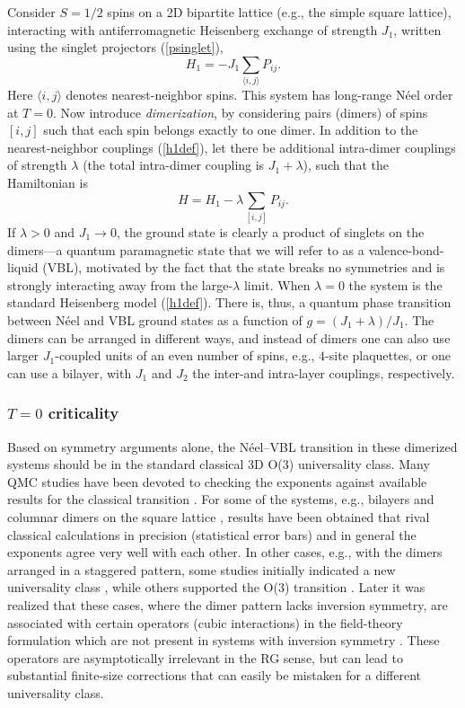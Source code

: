 \documentclass[range]{ar2e}
\begin{document}
Consider $S=1/2$ spins on a 2D bipartite lattice (e.g., the simple square lattice), interacting with antiferromagnetic Heisenberg exchange of 
strength $J_1$, written using the singlet projectors (\ref{psinglet}),
\begin{equation}
H_1 = -J_1 \sum_{\langle i,j\rangle} P_{ij}.
\label{h1def}
\end{equation}
Here $\langle i,j\rangle$ denotes nearest-neighbor spins. This system has long-range N\'eel order at $T=0$. Now introduce {\it dimerization}, 
by considering pairs (dimers) of spins $[i,j]$ such that each spin belongs exactly to one dimer. In addition to the nearest-neighbor couplings (\ref{h1def}),
let there be additional intra-dimer couplings of strength $\lambda$ (the total intra-dimer coupling is $J_1+\lambda$), such that the Hamiltonian is
\begin{equation}
H = H_1  -\lambda \sum_{[ i,j]} P_{ij} .
\end{equation}
If $\lambda>0$ and $J_1\to 0$, the ground state is clearly a product of singlets on the dimers---a quantum paramagnetic state that we will refer
to as a valence-bond-liquid (VBL), motivated by the fact that the state breaks no symmetries and is strongly interacting away from the large-$\lambda$
limit. When $\lambda=0$  the system is the standard Heisenberg model (\ref{h1def}). There is, thus, a quantum phase transition between N\'eel and VBL ground 
states as a function of $g=(J_1+\lambda)/J_1$. The dimers can be arranged in different ways, and instead of dimers one can also use larger $J_1$-coupled 
units of an even number of spins, e.g., $4$-site plaquettes, or one can use a bilayer, with $J_1$ and $J_2$ the inter-and intra-layer couplings, respectively.

\subsubsection{$T=0$ criticality}
Based on symmetry arguments alone, the N\'eel--VBL transition in these dimerized systems
should be in the standard classical 3D O($3$) universality class. Many QMC studies 
have been devoted to checking the exponents against available results for the classical transition \cite{Sandvik94,Troyer96,Matsumoto01,Wang06,Wenzel08,Wenzel09}.
For some of the systems, e.g., bilayers \cite{Wang06} and columnar dimers on the square lattice \cite{Matsumoto01,Wenzel09,Sandvik10b}, results have been 
obtained that rival classical calculations in precision (statistical error bars) and in general the exponents agree very well with each other. In other 
cases, e.g., with the dimers arranged in a staggered pattern, some studies initially indicated a new universality class \cite{Wenzel08}, while others
supported the O($3$) transition \cite{Jiang12}.  Later it was realized that these cases, where the dimer pattern lacks inversion symmetry, are associated 
with certain operators (cubic interactions) in the field-theory formulation  which are not present in systems with inversion symmetry \cite{Fritz11}. 
These operators are asymptotically irrelevant in the RG sense, but can lead to substantial finite-size corrections that can easily be mistaken for a 
different universality class.
\end{document}
